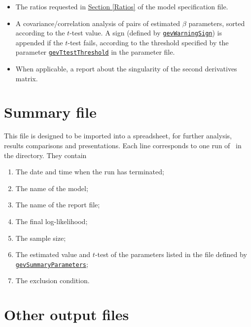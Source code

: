 \documentclass[12pt]{memoir}
\begin{document}
\begin{itemize}
      \item The ratios requested in \hyperlink{Ratios}{Section [Ratios]} of the model 
         specification file.
      \item A covariance/correlation analysis of pairs of estimated $\beta$
         parameters, sorted according to the $t$-test value.  A sign (defined
         by \hyperlink{gevWarningSign}{\texttt{gevWarningSign}}) is appended
         if the $t$-test fails, according to the threshold specified by the
         parameter \hyperlink{gevTtestThreshold}{\texttt{gevTtestThreshold}}
         in the parameter file. 
      \item When applicable, a report about the singularity of the second derivatives matrix. 
   \end{itemize}

\section{Summary file}

   This file is designed to be imported into a spreadsheet, for further
   analysis, results comparisons and presentations. Each line corresponds
   to one run of \BIOGEME\ in the directory. They contain
   \begin{enumerate}
      \item The date and time when the run has terminated;
      \item The name of the model;
      \item The name of the report file;
      \item The final log-likelihood;
      \item The sample size;
      \item The estimated value and $t$-test of the parameters listed in the
         file defined by
         \hyperlink{gevSummaryParameters}{\texttt{gevSummaryParameters}};
      \item The exclusion condition.
   \end{enumerate}


\section{Other output files}
\end{document}
